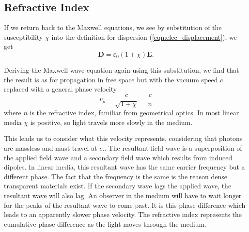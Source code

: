   \subsection{Refractive Index}

    If we return back to the Maxwell equations, we see by substitution of the
    susceptibility $\chi$ into the definition for dispersion
    (\ref{eqn:elec_displacement}), we get
    \begin{equation}
        \mathbf{D} = \varepsilon_0 (1 + \chi) \mathbf{E}.
    \end{equation}

    Deriving the Maxwell wave equation again using this substitution, we find
    that the result is as for propagation in free space but with the vacuum
    speed $c$ replaced with a general phase velocity      
    \begin{equation}
        v_p = \frac{c}{\sqrt{1 + \chi}} = \frac{c}{n}
    \end{equation}
    where $n$ is the refractive index, familiar from geometrical optics. In most
    linear media $\chi$ is positive, so light travels more slowly in the
    medium.\cite{James1992}

    This leads us to consider what this velocity represents, considering that
    photons are massless and must travel at $c$.\cite{feynman1963feynman}. The
    resultant field wave is a superposition of the applied field wave and a
    secondary field wave which results from induced dipoles. In linear media,
    this resultant wave has the same carrier frequency but a different phase.
    The fact that the frequency is the same is the reason dense transparent
    materials exist. If the secondary wave lags the applied wave, the resultant
    wave will also lag. An observer in the medium will have to wait longer for
    the peaks of the resultant wave to come past. It is this phase difference
    which leads to an apparently slower phase velocity. The refractive index
    represents the cumulative phase difference as the light moves through the
    medium.\cite{hecht2015optics}

  
